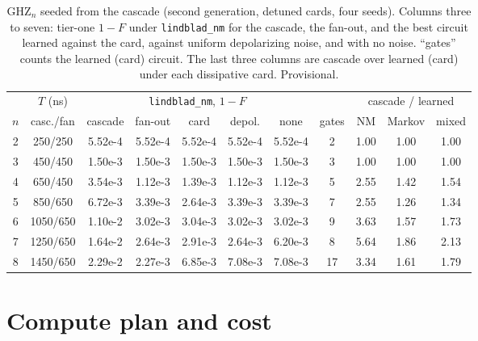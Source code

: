 \documentclass[10pt]{article}
\begin{document}
\begin{table}[htbp]
\centering
\caption{GHZ$_n$ seeded from the cascade (second generation, detuned cards,
four seeds). Columns three to seven: tier-one $1-F$ under
\texttt{lindblad\_nm} for the cascade, the fan-out, and the best circuit
learned against the card, against uniform depolarizing noise, and with no
noise. ``gates'' counts the learned (card) circuit. The last three columns are
cascade over learned (card) under each dissipative card. Provisional.}
\label{tab:ghzn}
\small
\setlength{\tabcolsep}{4pt}
\begin{tabular}{ccccccccccc}
\toprule
 & $T$ (ns) & \multicolumn{5}{c}{\texttt{lindblad\_nm}, $1-F$} & & \multicolumn{3}{c}{cascade / learned} \\
\cmidrule(lr){3-7}\cmidrule(lr){9-11}
$n$ & casc./fan & cascade & fan-out & card & depol. & none & gates & NM & Markov & mixed \\
\midrule
2 & 250/250 & 5.52e-4 & 5.52e-4 & 5.52e-4 & 5.52e-4 & 5.52e-4 & 2 & 1.00 & 1.00 & 1.00 \\
3 & 450/450 & 1.50e-3 & 1.50e-3 & 1.50e-3 & 1.50e-3 & 1.50e-3 & 3 & 1.00 & 1.00 & 1.00 \\
4 & 650/450 & 3.54e-3 & 1.12e-3 & 1.39e-3 & 1.12e-3 & 1.12e-3 & 5 & 2.55 & 1.42 & 1.54 \\
5 & 850/650 & 6.72e-3 & 3.39e-3 & 2.64e-3 & 3.39e-3 & 3.39e-3 & 7 & 2.55 & 1.26 & 1.34 \\
6 & 1050/650 & 1.10e-2 & 3.02e-3 & 3.04e-3 & 3.02e-3 & 3.02e-3 & 9 & 3.63 & 1.57 & 1.73 \\
7 & 1250/650 & 1.64e-2 & 2.64e-3 & 2.91e-3 & 2.64e-3 & 6.20e-3 & 8 & 5.64 & 1.86 & 2.13 \\
8 & 1450/650 & 2.29e-2 & 2.27e-3 & 6.85e-3 & 7.08e-3 & 7.08e-3 & 17 & 3.34 & 1.61 & 1.79 \\
\bottomrule
\end{tabular}
\end{table}

\section{Compute plan and cost}
\label{sec:compute}
\end{document}
